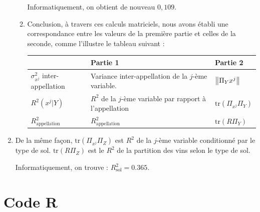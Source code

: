 \documentclass{article}
\begin{document}
\begin{enumerate}
\begin{enumerate}
	Informatiquement, on obtient de nouveau $0,109$.
	
	\item Conclusion, à travers ces calculs matriciels, nous avons établi une correspondance entre les valeurs de la première partie et celles de la seconde, comme l'illustre le tableau suivant : 
	
	\begin{center}
	\begin{tabular}{|m{3cm}|>{\centering\arraybackslash}m{5cm}|>{\centering\arraybackslash}m{5cm}|}
	\hline 
	 & Partie 1 & Partie 2 \\ 
	\hline 
$\sigma_{x^j}^2$ inter-appellation	 & Variance inter-appellation de la $j$-ème variable. & $\left\|  \Pi_Y x^j\right\|$ \\ 
	\hline 
	$R^2(x^j|Y)$ & $R^2$ de la $j$-ème variable par rapport à l'appellation  & $\text{tr}(\Pi_{x^j}\Pi_{Y})$ \\ 
	\hline 
	$R^2_{\text{appellation}}$ & $R^2_{\text{appellation}}$ & $\text{tr}(R\Pi_Y)$ \\ 
	\hline 
	\end{tabular} 
	\end{center}
	\end{enumerate}
	

\item De la même façon, $\text{tr}(\Pi_{x^j}\Pi_{Z})$ est $R^2$ de la $j$-ème variable conditionné par le type de sol. $\text{tr}(R\Pi_{Z})$ est le $R^2$ de la partition des vins selon le type de sol.

Informatiquement, on trouve : $R^2_{\text{sol}}=0.365$.
\end{enumerate}

\newpage

\appendix 

\section{Code R}
\end{document}
